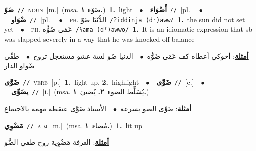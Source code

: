 \documentclass[10pt,a4paper,twoside]{article} %
\begin{document}
\begin{multicols}{2}
{\setlength\topsep{0pt}\textbf{\foreignlanguage{arabic}{ضَوّ}}\ {\color{gray}\texttt{//}\color{black}}\ \textsc{noun}\ [m.]\ \color{gray}(msa. \foreignlanguage{arabic}{ضَوْء}~\foreignlanguage{arabic}{\textbf{١.}})\color{black}\ \textbf{1.}~light\ \ $\bullet$\ \ \setlength\topsep{0pt}\textbf{\foreignlanguage{arabic}{أَضْوَاء}}\ {\color{gray}\texttt{//}\color{black}}\ [pl.]\ \ $\bullet$\ \ \setlength\topsep{0pt}\textbf{\foreignlanguage{arabic}{ضْوَاو}}\ {\color{gray}\texttt{//}\color{black}}\ [pl.]\ \ $\bullet$\ \ \textsc{ph.} \color{gray} \foreignlanguage{arabic}{الدُّنْيَا ضَوّ}\color{black}\ {\color{gray}\texttt{/{\sffamily ʔiddinja (dˤ)aww}/}\color{black}}\ \textbf{1.}~the sun did not set yet\ \ $\bullet$\ \ \textsc{ph.} \color{gray} \foreignlanguage{arabic}{عَمَى ضَوُّه}\color{black}\ {\color{gray}\texttt{/{\sffamily ʕama (dˤ)awwo}/}\color{black}}\ \textbf{1.}~It is an idiomatic expression that sb was slapped severely in a way that he was knocked off-balance\  \begin{flushright}\color{gray}\foreignlanguage{arabic}{\textbf{\underline{\foreignlanguage{arabic}{أمثلة}}}: أخوكي أعطاه كف عَمَى ضَوُّه\ $\bullet$\ \  الدنيا ضَو لسة عشو مستعجل تروح\ $\bullet$\ \  طفِّي ضْواو الدار}\end{flushright}\color{black}} \vspace{2mm}

{\setlength\topsep{0pt}\textbf{\foreignlanguage{arabic}{ضَوَّى}}\ {\color{gray}\texttt{//}\color{black}}\ \textsc{verb}\ [p.]\ \textbf{1.}~light up.  \textbf{2.}~highlight\ \ $\bullet$\ \ \setlength\topsep{0pt}\textbf{\foreignlanguage{arabic}{ضَوِّى}}\ {\color{gray}\texttt{//}\color{black}}\ [c.]\ \ $\bullet$\ \ \setlength\topsep{0pt}\textbf{\foreignlanguage{arabic}{يضَوِّى}}\ {\color{gray}\texttt{//}\color{black}}\ [i.]\ \color{gray}(msa. \foreignlanguage{arabic}{يُسَلِّط الضوء}~\foreignlanguage{arabic}{\textbf{٢.}}  \foreignlanguage{arabic}{يُضيئ}~\foreignlanguage{arabic}{\textbf{١.}})\color{black}\  \begin{flushright}\color{gray}\foreignlanguage{arabic}{\textbf{\underline{\foreignlanguage{arabic}{أمثلة}}}: ضَوِّى الضو بسرعة\ $\bullet$\ \  الأستاذ ضَوَّى عنقطة مهمة بالاجتماع}\end{flushright}\color{black}} \vspace{2mm}

{\setlength\topsep{0pt}\textbf{\foreignlanguage{arabic}{مَضْوِي}}\ {\color{gray}\texttt{//}\color{black}}\ \textsc{adj}\ [m.]\ \color{gray}(msa. \foreignlanguage{arabic}{مُضاء}~\foreignlanguage{arabic}{\textbf{١.}})\color{black}\ \textbf{1.}~lit up\  \begin{flushright}\color{gray}\foreignlanguage{arabic}{\textbf{\underline{\foreignlanguage{arabic}{أمثلة}}}: الغرفة مَضْوِية روح طفي الضَّو}\end{flushright}\color{black}} \vspace{2mm}


\end{multicols}
\end{document}
